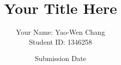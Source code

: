 \documentclass[twocolumn]{article}
\begin{document}
\title{Your Title Here}
\author{Your Name: Yao-Wen Chang\\Student ID: 1346258}
\date{Submission Date}





\newpage

\end{document}
